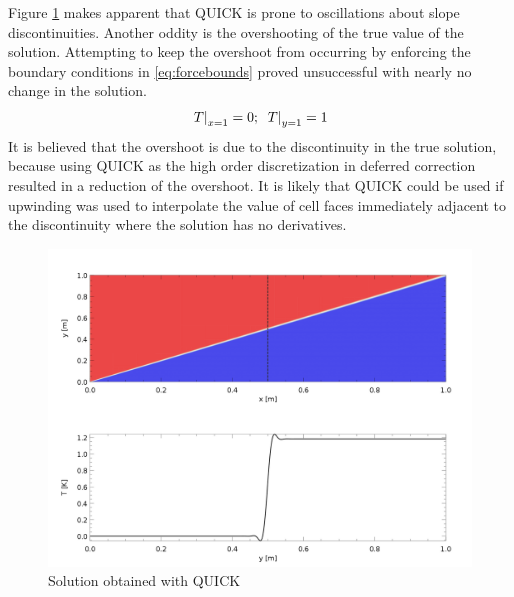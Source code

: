 \documentclass[12pt,twocolumn]{article}
\begin{document}
Figure \ref{fig:quickslice} makes apparent that QUICK is prone to oscillations about slope discontinuities.
Another oddity is the overshooting of the true value of the solution.
Attempting to keep the overshoot from occurring by enforcing the boundary conditions in \eqref{eq:forcebounds} proved unsuccessful with nearly no change in the solution.
\begin{equation}\label{eq:forcebounds}\left.T\right|_{x=1} = 0;\hspace{1ex}\left.T\right|_{y=1} = 1\end{equation}
It is believed that the overshoot is due to the discontinuity in the true solution, because using QUICK as the high order discretization in deferred correction resulted in a reduction of the overshoot.
It is likely that QUICK could be used if upwinding was used to interpolate the value of cell faces immediately adjacent to the discontinuity where the solution has no derivatives.
\begin{figure}
\includegraphics[width=\columnwidth]{plot/QuickSlice.png}
\footnotesize{\caption{Solution obtained with QUICK}\label{fig:quickslice}}
\end{figure}
\end{document}
